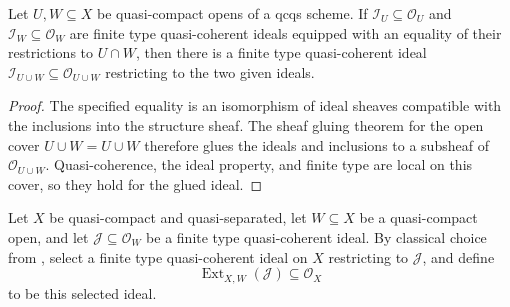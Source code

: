 \begin{lemma}
  \label{lemma:nagata-glue-finite-type-ideals}

  Let $U,W\subseteq X$ be quasi-compact opens of a qcqs scheme.  If
  $\mathcal I_U\subseteq\mathcal O_U$ and
  $\mathcal I_W\subseteq\mathcal O_W$ are finite type quasi-coherent ideals
  equipped with an equality of their restrictions to $U\cap W$, then there is
  a finite type quasi-coherent ideal
  $\mathcal I_{U\cup W}\subseteq\mathcal O_{U\cup W}$ restricting to the two
  given ideals.
\end{lemma}

\begin{proof}
  The specified equality is an isomorphism of ideal sheaves compatible with
  the inclusions into the structure sheaf.  The sheaf gluing theorem for the
  open cover $U\cup W=U\cup W$ therefore glues the ideals and inclusions to a
  subsheaf of $\mathcal O_{U\cup W}$.  Quasi-coherence, the ideal property,
  and finite type are local on this cover, so they hold for the glued ideal.
\end{proof}

\begin{definition}
  \label{def:nagata-finite-type-ideal-extension}
  \leanok

  Let $X$ be quasi-compact and quasi-separated, let $W\subseteq X$ be a
  quasi-compact open, and let
  $\mathcal J\subseteq\mathcal O_W$ be a finite type quasi-coherent ideal.
  By classical choice from
  , select a finite type
  quasi-coherent ideal on $X$ restricting to $\mathcal J$, and define
  \[
    \operatorname{Ext}_{X,W}(\mathcal J)\subseteq\mathcal O_X
  \]
  to be this selected ideal.
\end{definition}

